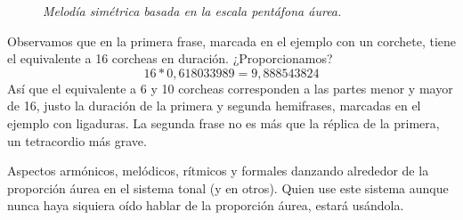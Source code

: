 \begin{figure}[H]
\begin{center}
\end{center}
\caption{\emph{Melodía simétrica basada en la escala pentáfona áurea.}}
\label{ej7}
\end{figure}

Observamos que en la primera frase, marcada en el ejemplo con un corchete, tiene el equivalente a 16 corcheas en duración. ¿Proporcionamos?
$$16*0,618033989=9,888543824$$
Así que el equivalente a 6 y 10 corcheas corresponden a las partes menor y mayor de 16, justo la duración de la primera y segunda hemifrases, marcadas en el ejemplo con ligaduras. La segunda frase no es más que la réplica de la primera, un tetracordio más grave.

Aspectos armónicos, melódicos, rítmicos y formales danzando alrededor de la proporción áurea en el sistema tonal (y en otros). Quien use este sistema aunque nunca haya siquiera oído hablar de la proporción áurea, estará usándola.

